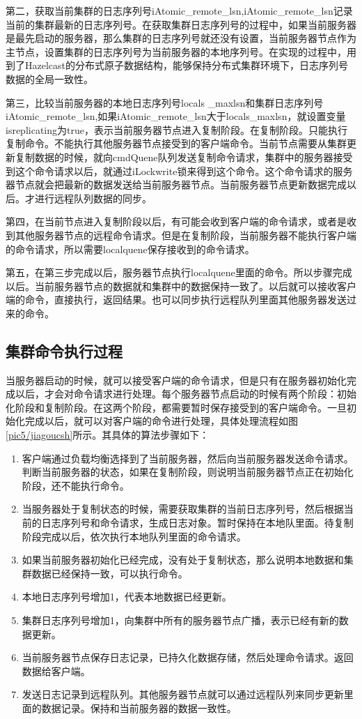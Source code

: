 第二，获取当前集群的日志序列号iAtomic\_remote\_lsn,iAtomic\_remote\_lsn记录当前的集群最新的日志序列号。在获取集群日志序列号的过程中，如果当前服务器是最先启动的服务器，那么集群的日志序列号就还没有设置，当前服务器节点作为主节点，设置集群的日志序列号为当前服务器的本地序列号。在实现的过程中，用到了Hazelcast的分布式原子数据结构，能够保持分布式集群环境下，日志序列号数据的全局一致性。

第三，比较当前服务器的本地日志序列号locals
\_maxlsn和集群日志序列号iAtomic\_remote\_lsn,如果iAtomic\_remote\_lsn大于locals\_maxlsn，就设置变量isreplicating为true，表示当前服务器节点进入复制阶段。在复制阶段。只能执行复制命令。不能执行其他服务器节点接受到的客户端命令。当前节点需要从集群更新复制数据的时候，就向cmdQuene队列发送复制命令请求，集群中的服务器接受到这个命令请求以后，就通过iLockwrite锁来得到这个命令。这个命令请求的服务器节点就会把最新的数据发送给当前服务器节点。当前服务器节点更新数据完成以后。才进行远程队列数据的同步。

第四，在当前节点进入复制阶段以后，有可能会收到客户端的命令请求，或者是收到其他服务器节点的远程命令请求。但是在复制阶段，当前服务器不能执行客户端的命令请求，所以需要localquene保存接收到的命令请求。

第五，在第三步完成以后，服务器节点执行localquene里面的命令。所以步骤完成以后。当前服务器节点的数据就和集群中的数据保持一致了。以后就可以接收客户端的命令，直接执行，返回结果。也可以同步执行远程队列里面其他服务器发送过来的命令。
\subsection{集群命令执行过程}
当服务器启动的时候，就可以接受客户端的命令请求，但是只有在服务器初始化完成以后，才会对命令请求进行处理。每个服务器节点启动的时候有两个阶段：初始化阶段和复制阶段。在这两个阶段，都需要暂时保存接受到的客户端命令。一旦初始化完成以后，就可以对客户端的命令进行处理，具体处理流程如图\ref{pic5/jiagoucsh}所示。其具体的算法步骤如下：

\begin{enumerate}[fullwidth,itemindent=2em]
	\item 客户端通过负载均衡选择到了当前服务器，然后向当前服务器发送命令请求。判断当前服务器的状态，如果在复制阶段，则说明当前服务器节点正在初始化阶段，还不能执行命令。
	\item 当服务器处于复制状态的时候，需要获取集群的当前日志序列号，然后根据当前的日志序列号和命令请求，生成日志对象。暂时保持在本地队里面。待复制阶段完成以后，依次执行本地队列里面的命令请求。
	\item 如果当前服务器初始化已经完成，没有处于复制状态，那么说明本地数据和集群数据已经保持一致，可以执行命令。
	\item 本地日志序列号增加1，代表本地数据已经更新。
	\item 集群日志序列号增加1，向集群中所有的服务器节点广播，表示已经有新的数据更新。
	\item 当前服务器节点保存日志记录，已持久化数据存储，然后处理命令请求。返回数据给客户端。
	\item 发送日志记录到远程队列。其他服务器节点就可以通过远程队列来同步更新里面的数据记录。保持和当前服务器的数据一致性。
\end{enumerate}

